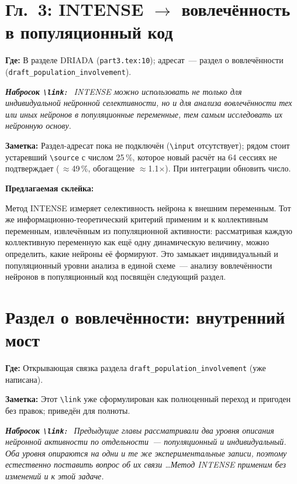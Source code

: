\documentclass[12pt,a4paper]{article}
\newenvironment{sketch}{%
  \begin{mdframed}[backgroundcolor=black!4, linecolor=black!25, linewidth=0.4pt,
    innertopmargin=5pt, innerbottommargin=5pt]\small\itshape
  \textbf{\upshape Набросок \texttt{\textbackslash link}:}\ }{%
  \end{mdframed}}
\newenvironment{glue}{%
  \begin{mdframed}[backgroundcolor=green!5, linecolor=green!40!black, linewidth=0.6pt,
    innertopmargin=5pt, innerbottommargin=5pt]
  \textbf{Предлагаемая склейка:}\par\smallskip}{%
  \end{mdframed}}
\newcommand{\loc}[1]{\par\noindent\textcolor{blue!55!black}{\textbf{Где:} #1}\par}
\newcommand{\note}[1]{\par\noindent\textcolor{red!60!black}{\textbf{Заметка:} #1}\par}
\begin{document}
\section{Гл.~3: INTENSE $\to$ вовлечённость в популяционный код}
\loc{В разделе DRIADA (\texttt{part3.tex:10}); адресат~--- раздел о вовлечённости
(\texttt{draft\_population\_involvement}).}
\begin{sketch}
INTENSE можно использовать не только для индивидуальной нейронной селективности,
но и для анализа вовлечённости тех или иных нейронов в популяционные переменные,
тем самым исследовать их нейронную основу.
\end{sketch}
\note{Раздел-адресат пока не подключён (\texttt{\textbackslash input} отсутствует);
рядом стоит устаревший \texttt{\textbackslash source} с числом 25\,\%, которое
новый расчёт на 64 сессиях не подтверждает (\,$\approx$49\,\%, обогащение
$\approx$1.1$\times$). При интеграции обновить число.}
\begin{glue}
Метод INTENSE измеряет селективность нейрона к внешним переменным. Тот же
информационно-теоретический критерий применим и к коллективным переменным,
извлечённым из популяционной активности: рассматривая каждую коллективную
переменную как ещё одну динамическую величину, можно определить, какие нейроны
её формируют. Это замыкает индивидуальный и популяционный уровни анализа в единой
схеме~--- анализу вовлечённости нейронов в популяционный код посвящён следующий
раздел.
\end{glue}

\section{Раздел о вовлечённости: внутренний мост}
\loc{Открывающая связка раздела \texttt{draft\_population\_involvement} (уже написана).}
\note{Этот \texttt{\textbackslash link} уже сформулирован как полноценный переход
и пригоден без правок; приведён для полноты.}
\begin{sketch}
Предыдущие главы рассматривали два уровня описания нейронной активности по
отдельности~--- популяционный и индивидуальный. Оба уровня опираются на одни и
те же экспериментальные записи, поэтому естественно поставить вопрос об их связи
\ldots Метод INTENSE применим без изменений и к этой задаче.
\end{sketch}
\end{document}
